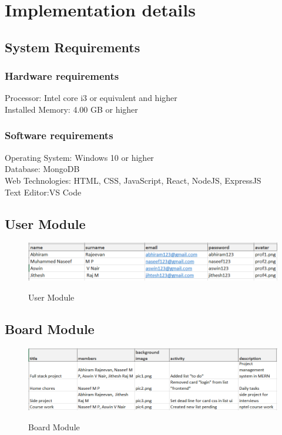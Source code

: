 \chapter{Implementation details}
\section{System Requirements}
\subsection{Hardware requirements}
Processor: Intel core i3 or equivalent and higher\\
Installed Memory: 4.00 GB or higher
\subsection{Software requirements}
Operating System: Windows 10 or higher\\
Database: MongoDB\\
Web Technologies: HTML, CSS, JavaScript, React, NodeJS, ExpressJS\\
Text Editor:VS Code


\section{User Module}
\begin{figure}[!htbp]
    \centering
    \includegraphics[scale = 0.6]{user.png}\\[0.1in]
    \caption{User Module}
    \label{fig:my_label}
\end{figure}
\FloatBarrier
\section{Board Module}
\begin{figure}[!htbp]
    \centering
    \includegraphics[scale = 0.6]{boards.png}\\[0.1in]
    \caption{Board Module}
    \label{fig:my_label}
\end{figure}
\FloatBarrier

